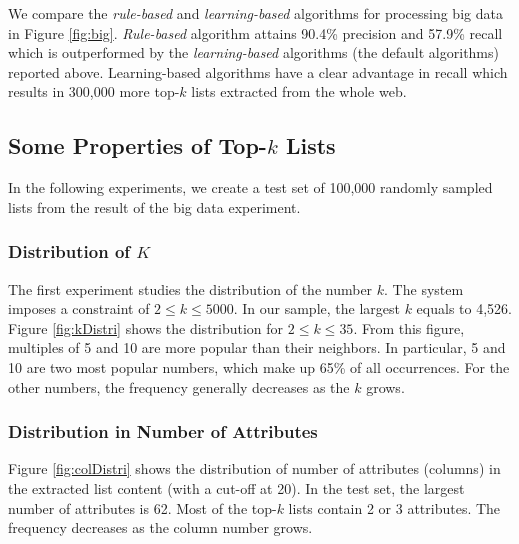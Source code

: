 We compare the \emph{rule-based} and \emph{learning-based} algorithms for
processing big data in Figure \ref{fig:big}.
\emph{Rule-based} algorithm attains 90.4\% precision and 57.9\% recall which
is outperformed by the {\em learning-based} algorithms (the default algorithms) 
reported above.
Learning-based algorithms have a clear advantage in recall which results in
300,000 more top-$k$ lists extracted from the whole web.

\subsection{Some Properties of Top-$k$ Lists}
In the following experiments, we create a test set of
100,000 randomly sampled lists from the result of the big data experiment.

\subsubsection{Distribution of $K$}
The first experiment studies the distribution of the number $k$.
The system imposes a constraint of $2 \le k \le 5000$.
In our sample, the largest $k$ equals to 4,526.
Figure \ref{fig:kDistri} shows the distribution for $2 \le k \le 35$.
From this figure, multiples of 5 and 10 are more popular than their neighbors.
In particular, 5 and 10 are two most popular numbers, which
make up 65\% of all occurrences.
For the other numbers, the frequency generally decreases as the $k$ grows.



\subsubsection{Distribution in Number of Attributes}
Figure \ref{fig:colDistri} shows the distribution of number of
attributes (columns) in the extracted list content (with a cut-off at 20).
In the test set, the largest number of attributes is 62.
Most of the top-$k$ lists contain 2 or 3 attributes.
The frequency decreases as the column number grows.


